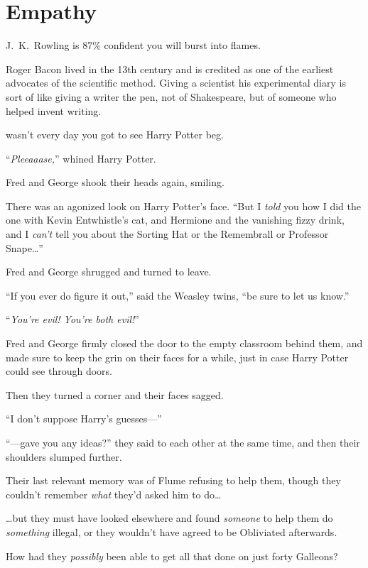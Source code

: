 \chapter{Empathy}

\begin{chapterOpeningAuthorNote}
J.~K.~Rowling is 87\% confident you will burst into flames.

Roger Bacon lived in the 13th century and is credited as one of the earliest advocates of the scientific method. Giving a scientist his experimental diary is sort of like giving a writer the pen, not of Shakespeare, but of someone who helped invent writing.
\end{chapterOpeningAuthorNote}

 wasn’t every day you got to see Harry Potter beg.

\hplettrineextrapara
“\emph{Pleeaaase,}” whined Harry Potter.

Fred and George shook their heads again, smiling.

There was an agonized look on Harry Potter’s face. “But I \emph{told} you how I did the one with Kevin Entwhistle’s cat, and Hermione and the vanishing fizzy drink, and I \emph{can’t} tell you about the Sorting Hat or the Remembrall or Professor Snape…”

Fred and George shrugged and turned to leave.

“If you ever do figure it out,” said the Weasley twins, “be sure to let us know.”

“\emph{You’re evil! You’re both evil!}”

Fred and George firmly closed the door to the empty classroom behind them, and made sure to keep the grin on their faces for a while, just in case Harry Potter could see through doors.

Then they turned a corner and their faces sagged.

“I don’t suppose Harry’s guesses—”

“—gave you any ideas?” they said to each other at the same time, and then their shoulders slumped further.

Their last relevant memory was of Flume refusing to help them, though they couldn’t remember \emph{what} they’d asked him to do…

…but they must have looked elsewhere and found \emph{someone} to help them do \emph{something} illegal, or they wouldn’t have agreed to be Obliviated afterwards.

How had they \emph{possibly} been able to get all that done on just forty Galleons?

